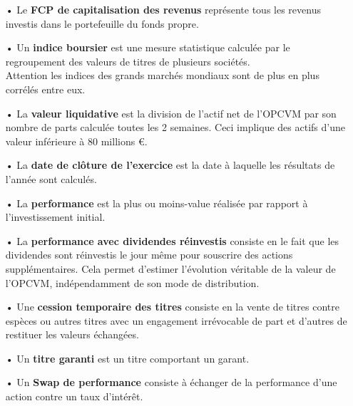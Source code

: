 \documentclass[french,12pt,a4paper]{article}
\begin{document}
\begin{itemize}
\item[•]
Le \textbf{FCP de capitalisation des revenus} représente tous les revenus investis dans le portefeuille du fonds propre.\\

\item[•]
Un \textbf{indice boursier} est une mesure statistique calculée par le regroupement des valeurs de titres de plusieurs sociétés.\\
Attention les indices des grands marchés mondiaux sont de plus en plus corrélés entre eux.\\
 
\item[•]
La \textbf{valeur liquidative} est la division de l’actif net de l’OPCVM par son nombre de parts calculée toutes les 2 semaines. Ceci implique des actifs d'une valeur inférieure à 80 millions €.\\

\item[•]
La \textbf{date de clôture de l'exercice} est la date à laquelle les résultats de l'année sont calculés.\\

\item[•]
La \textbf{performance} est la plus ou moins-value réalisée par rapport à l’investissement initial.\\

\item[•]
La \textbf{performance avec dividendes réinvestis} consiste en le fait que les dividendes sont réinvestis le jour même pour souscrire des actions supplémentaires. Cela permet d’estimer l’évolution véritable de la valeur de l’OPCVM, indépendamment de son mode de distribution. \\

\item[•]
Une \textbf{cession temporaire des titres} consiste en la vente de titres contre espèces ou autres titres avec un engagement irrévocable de part et d’autres de restituer les valeurs échangées.\\

\item[•]
Un \textbf{titre garanti} est un titre comportant un garant.\\

\item[•]
Un \textbf{Swap de performance} consiste à échanger de la performance d'une action contre un taux d'intérêt.\\


\end{itemize}
\end{document}
